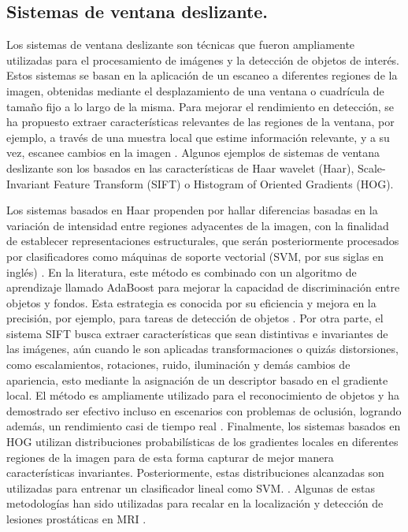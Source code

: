 \subsection{Sistemas de ventana deslizante. }%
Los sistemas de ventana deslizante son técnicas que fueron ampliamente utilizadas para el procesamiento de imágenes y la detección de objetos de interés. Estos sistemas se basan en la aplicación de un escaneo a diferentes regiones de la imagen, obtenidas mediante el desplazamiento de una ventana o cuadrícula de tamaño fijo a lo largo de la misma. Para mejorar el rendimiento en detección, se ha propuesto extraer características relevantes de las regiones de la ventana, por ejemplo, a través de una muestra local que estime información relevante, y a su vez, escanee cambios en la imagen . Algunos ejemplos de sistemas de ventana deslizante son los basados en las características de Haar wavelet (Haar), Scale-Invariant Feature Transform (SIFT) o Histogram of Oriented Gradients (HOG).\par
Los sistemas basados en Haar propenden por hallar diferencias basadas en la variación de intensidad entre regiones adyacentes de la imagen, con la finalidad de establecer representaciones estructurales, que serán posteriormente procesados por clasificadores como máquinas de soporte vectorial (SVM, por sus siglas en inglés) . En la literatura, este método es combinado con un algoritmo de aprendizaje llamado AdaBoost para mejorar la capacidad de discriminación entre objetos y fondos. Esta estrategia es conocida por su eficiencia y mejora en la precisión, por ejemplo, para tareas de detección de objetos . Por otra parte, el sistema SIFT busca extraer características que sean distintivas e invariantes de las imágenes, aún cuando le son aplicadas transformaciones o quizás distorsiones, como escalamientos, rotaciones, ruido, iluminación y demás cambios de apariencia, esto mediante la asignación de un descriptor basado en el gradiente local. El método es ampliamente utilizado para el reconocimiento de objetos y ha demostrado ser efectivo incluso en escenarios con problemas de oclusión, logrando además, un rendimiento casi de tiempo real . Finalmente, los sistemas basados en HOG utilizan distribuciones probabilísticas de los gradientes locales en diferentes regiones de la imagen para de esta forma capturar de mejor manera características invariantes. Posteriormente, estas distribuciones alcanzadas son utilizadas para entrenar un clasificador lineal como SVM. . Algunas de estas metodologías han sido utilizadas para recalar en la localización y detección de lesiones prostáticas en MRI .

